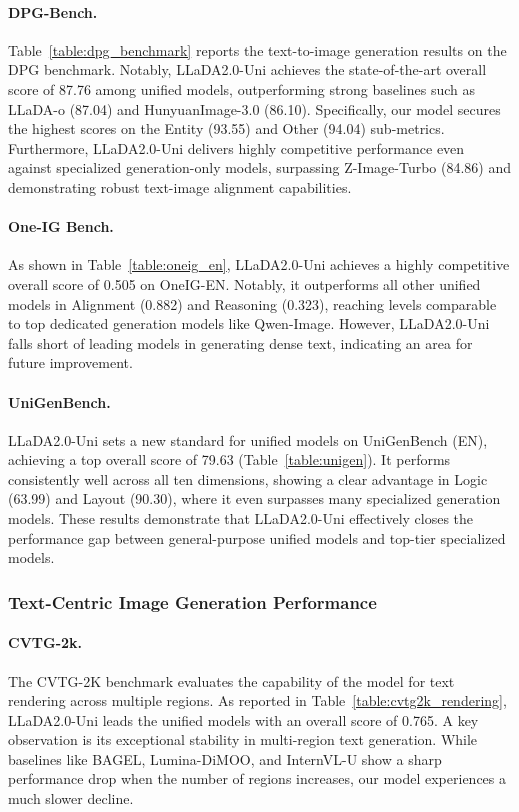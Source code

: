 \paragraph{DPG-Bench.} Table~\ref{table:dpg_benchmark} reports the text-to-image generation results on the DPG benchmark.
%
Notably, LLaDA2.0-Uni achieves the state-of-the-art overall score of 87.76 among unified models, outperforming strong baselines such as LLaDA-o (87.04) and HunyuanImage-3.0 (86.10).
%
Specifically, our model secures the highest scores on the Entity (93.55) and Other (94.04) sub-metrics.
%
Furthermore, LLaDA2.0-Uni delivers highly competitive performance even against specialized generation-only models, surpassing Z-Image-Turbo (84.86) and demonstrating robust text-image alignment capabilities.


\paragraph{One-IG Bench.} As shown in Table~\ref{table:oneig_en}, LLaDA2.0-Uni achieves a highly competitive overall score of 0.505 on OneIG-EN.
%
Notably, it outperforms all other unified models in Alignment (0.882) and Reasoning (0.323), reaching levels comparable to top dedicated generation models like Qwen-Image.
%
However, LLaDA2.0-Uni falls short of leading models in generating dense text, indicating an area for future improvement.

\paragraph{UniGenBench.} LLaDA2.0-Uni sets a new standard for unified models on UniGenBench (EN), achieving a top overall score of 79.63 (Table~\ref{table:unigen}).
%
It performs consistently well across all ten dimensions, showing a clear advantage in Logic (63.99) and Layout (90.30), where it even surpasses many specialized generation models.
%
These results demonstrate that LLaDA2.0-Uni effectively closes the performance gap between general-purpose unified models and top-tier specialized models.


\subsubsection{Text-Centric Image Generation Performance}
\paragraph{CVTG-2k.}
The CVTG-2K benchmark evaluates the capability of the model for text rendering across multiple regions.
%
As reported in Table~\ref{table:cvtg2k_rendering}, LLaDA2.0-Uni leads the unified models with an overall score of 0.765.
%
A key observation is its exceptional stability in multi-region text generation.
%
While baselines like BAGEL, Lumina-DiMOO, and InternVL-U show a sharp performance drop when the number of regions increases, our model experiences a much slower decline.


